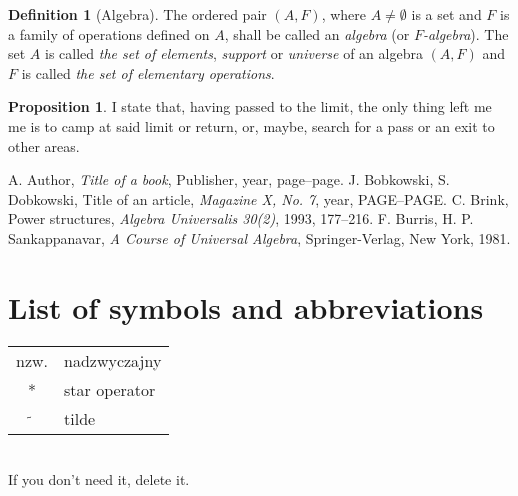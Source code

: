 \documentclass[a4paper,11pt,twoside]{report}
\theoremstyle{definition}
\newtheorem{proposition}[theorem]{Proposition}
\newtheorem{definition}[theorem]{Definition}
\begin{document}
\begin{definition}[Algebra]
    The ordered pair $(A,F)$, where $A\neq \emptyset$ is a set and $F$ is a family of operations defined on $A$, shall be called an \emph{algebra} (or \emph{$F$-algebra}). The set $A$ is called \emph{the set of elements}, \emph{support} or \emph{universe} of an algebra $(A,F)$ and $F$ is called \emph{the set of elementary operations}.
\end{definition}

\begin{proposition}
    I state that, having passed to the limit, the only thing left me me is to camp at said limit or return, or, maybe, search for a pass or an exit to other areas.
\end{proposition}







\begin{thebibliography}{20} %

     A. Author, \emph{Title of a book}, Publisher, year, page--page.
     J. Bobkowski, S. Dobkowski, Title of an article, \emph{Magazine X, No. 7}, year, PAGE--PAGE.
     C. Brink, Power structures, \emph{Algebra Universalis 30(2)}, 1993, 177--216.
     F. Burris, H. P. Sankappanavar, \emph{A Course of Universal Algebra}, Springer-Verlag, New York, 1981.
\end{thebibliography}
\thispagestyle{empty}



\chapter*{List of symbols and abbreviations}

\begin{tabular}{cl}
    nzw.           & nadzwyczajny  \\
    *              & star operator \\
    $\widetilde{}$ & tilde
\end{tabular}
\\
If you don't need it, delete it.
\thispagestyle{empty}
\end{document}
